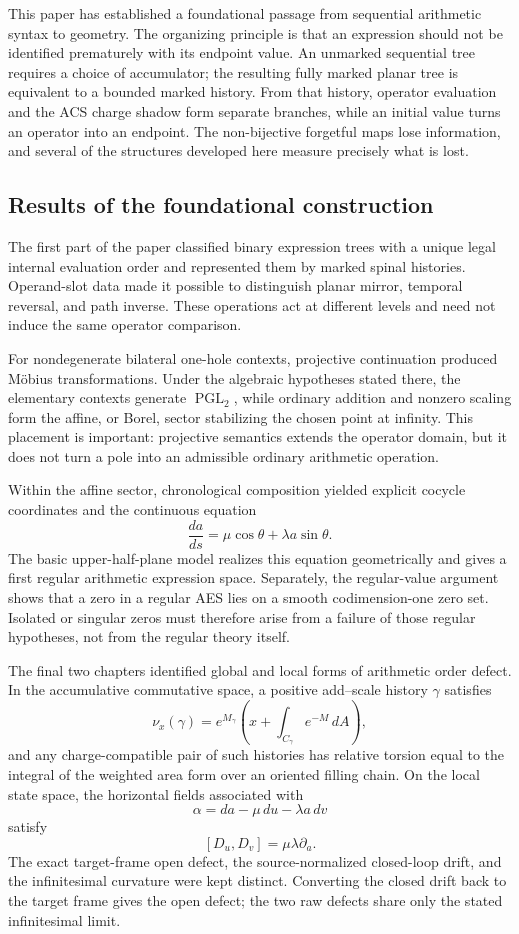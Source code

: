 This paper has established a foundational passage from sequential arithmetic
syntax to geometry.  The organizing principle is that an expression should not
be identified prematurely with its endpoint value.  An unmarked sequential tree
requires a choice of accumulator; the resulting fully marked planar tree is
equivalent to a bounded marked history.  From that history, operator evaluation
and the ACS charge shadow form separate branches, while an initial value turns an
operator into an endpoint.  The non-bijective forgetful maps lose information, and
several of the structures developed here measure precisely what is lost.

\subsection{Results of the foundational construction}

The first part of the paper classified binary expression trees with a unique
legal internal evaluation order and represented them by marked spinal
histories.  Operand-slot data made it possible to distinguish planar mirror,
temporal reversal, and path inverse.  These operations act at different levels
and need not induce the same operator comparison.

For nondegenerate bilateral one-hole contexts, projective continuation produced
M\"obius transformations.  Under the algebraic hypotheses stated there, the
elementary contexts generate \(\operatorname{PGL}_2\), while ordinary
addition and nonzero scaling form the affine, or Borel, sector stabilizing the
chosen point at infinity.  This placement is important: projective semantics
extends the operator domain, but it does not turn a pole into an admissible
ordinary arithmetic operation.

Within the affine sector, chronological composition yielded explicit cocycle
coordinates and the continuous equation
\[
    \frac{da}{ds}
       =\mu\cos\theta+\lambda a\sin\theta.
\]
The basic upper-half-plane model realizes this equation geometrically and gives
a first regular arithmetic expression space.  Separately, the regular-value
argument shows that a zero in a regular AES lies on
a smooth codimension-one zero set.  Isolated or singular zeros must therefore
arise from a failure of those regular hypotheses, not from the regular theory
itself.

The final two chapters identified global and local forms of arithmetic order
defect.  In the accumulative commutative space, a positive add--scale history
\(\gamma\) satisfies
\[
    \nu_x(\gamma)
      =e^{M_\gamma}
        \left(x+\int_{C_\gamma}e^{-M}\,dA\right),
\]
and any charge-compatible pair of such histories has relative torsion equal to the
integral of the weighted area form over an oriented filling chain.  On the local state
space, the horizontal fields associated with
\[
    \alpha=da-\mu\,du-\lambda a\,dv
\]
satisfy
\[
    [D_u,D_v]=\mu\lambda\partial_a.
\]
The exact target-frame open defect, the source-normalized closed-loop drift, and the
infinitesimal curvature were kept distinct.  Converting the closed drift back to the
target frame gives the open defect; the two raw defects share only the stated
infinitesimal limit.

